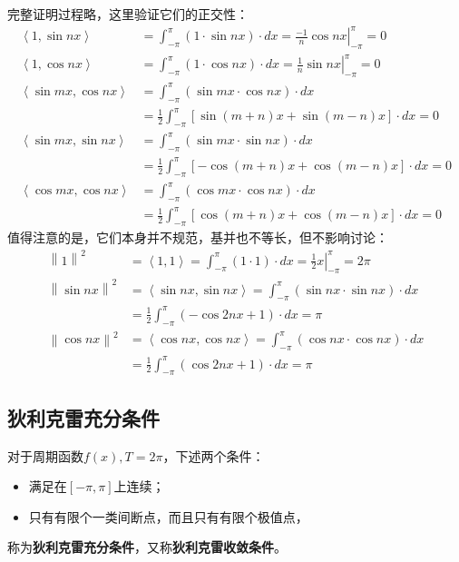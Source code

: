完整证明过程略，这里验证它们的正交性：
\begin{align*}
\left< 1,\sin nx \right> &=\int_{-\pi}^{\pi}{\left( 1\cdot \sin nx \right) \cdot dx}=\left. \frac{-1}{n}\cos nx \right|_{-\pi}^{\pi}=0 \\
\left< 1,\cos nx \right> &=\int_{-\pi}^{\pi}{\left( 1\cdot \cos nx \right) \cdot dx}=\left. \frac{1}{n}\sin nx \right|_{-\pi}^{\pi}=0 \\
\left< \sin mx,\cos nx \right> &=\int_{-\pi}^{\pi}{\left( \sin mx\cdot \cos nx \right) \cdot dx} \\
&=\frac{1}{2}\int_{-\pi}^{\pi}{\left[ \sin \left( m+n \right) x+\sin \left( m-n \right) x \right] \cdot dx}=0 \\
\left< \sin mx,\sin nx \right> &=\int_{-\pi}^{\pi}{\left( \sin mx\cdot \sin nx \right) \cdot dx} \\
&=\frac{1}{2}\int_{-\pi}^{\pi}{\left[ -\cos \left( m+n \right) x+\cos \left( m-n \right) x \right] \cdot dx}=0 \\
\left< \cos mx,\cos nx \right> &=\int_{-\pi}^{\pi}{\left( \cos mx\cdot \cos nx \right) \cdot dx} \\
&=\frac{1}{2}\int_{-\pi}^{\pi}{\left[ \cos \left( m+n \right) x+\cos \left( m-n \right) x \right] \cdot dx}=0
\end{align*}
值得注意的是，它们本身并不规范，基并也不等长，但不影响讨论：
\begin{align*}
\left\| 1 \right\| ^2&=\left< 1,1 \right> =\int_{-\pi}^{\pi}{\left( 1\cdot 1 \right) \cdot dx}=\left. \frac{1}{2}x \right|_{-\pi}^{\pi}=2\pi \\
\left\| \sin nx \right\| ^2&=\left< \sin nx,\sin nx \right> =\int_{-\pi}^{\pi}{\left( \sin nx\cdot \sin nx \right) \cdot dx} \\
&=\frac{1}{2}\int_{-\pi}^{\pi}{\left( -\cos 2nx+1 \right) \cdot dx}=\pi \\
\left\| \cos nx \right\| ^2&=\left< \cos nx,\cos nx \right> =\int_{-\pi}^{\pi}{\left( \cos nx\cdot \cos nx \right) \cdot dx} \\
&=\frac{1}{2}\int_{-\pi}^{\pi}{\left( \cos 2nx+1 \right) \cdot dx}=\pi
\end{align*}

\subsection{狄利克雷充分条件}

\begin{definition}[狄利克雷充分条件]
对于周期函数$f\left( x \right) ,T=2\pi $，下述两个条件：
\begin{itemize}
    \item 满足在$\left[ -\pi ,\pi \right] $上连续；
    \item 只有有限个一类间断点，而且只有有限个极值点，
\end{itemize}
称为{\bf 狄利克雷充分条件}，又称{\bf 狄利克雷收敛条件}。
\end{definition}

